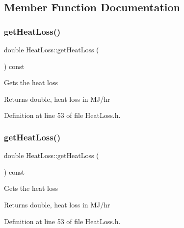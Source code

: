 \subsection{Member Function Documentation}
\mbox{\label{class_heat_loss_acc39533782f4f5cbf902d36f7bfc53b0}} 
\subsubsection{\texorpdfstring{get\+Heat\+Loss()}{getHeatLoss()}\hspace{0.1cm}{\footnotesize\ttfamily [1/3]}}
{\footnotesize\ttfamily double Heat\+Loss\+::get\+Heat\+Loss (\begin{DoxyParamCaption}{ }\end{DoxyParamCaption}) const\hspace{0.3cm}{\ttfamily [inline]}}

Gets the heat loss \begin{DoxyReturn}{Returns}
double, heat loss in M\+J/hr 
\end{DoxyReturn}


Definition at line 53 of file Heat\+Loss.\+h.

\mbox{\label{class_heat_loss_acc39533782f4f5cbf902d36f7bfc53b0}} 
\subsubsection{\texorpdfstring{get\+Heat\+Loss()}{getHeatLoss()}\hspace{0.1cm}{\footnotesize\ttfamily [2/3]}}
{\footnotesize\ttfamily double Heat\+Loss\+::get\+Heat\+Loss (\begin{DoxyParamCaption}{ }\end{DoxyParamCaption}) const\hspace{0.3cm}{\ttfamily [inline]}}

Gets the heat loss \begin{DoxyReturn}{Returns}
double, heat loss in M\+J/hr 
\end{DoxyReturn}


Definition at line 53 of file Heat\+Loss.\+h.

\mbox{\label{class_heat_loss_acc39533782f4f5cbf902d36f7bfc53b0}} 

